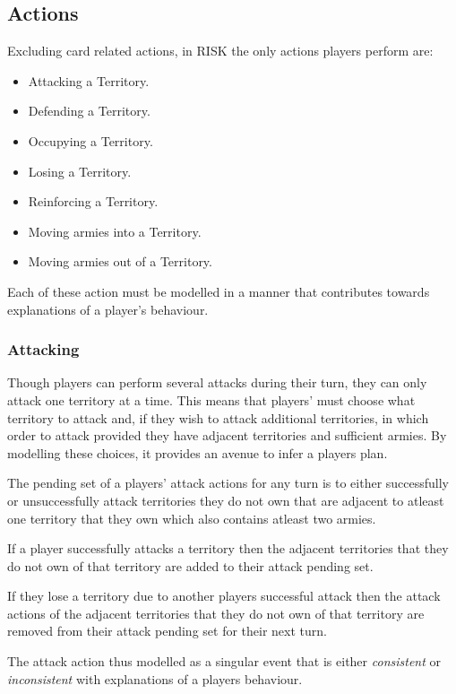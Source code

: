 \documentclass[parskip]{cs4rep}
\begin{document}
\subsection{Actions}

Excluding card related actions, in RISK the only actions players perform are:

\begin{itemize}
\item
Attacking a Territory.
\item
Defending a Territory.
\item
Occupying a Territory.
\item
Losing a Territory.
\item
Reinforcing a Territory.
\item
Moving armies into a Territory.
\item
Moving armies out of a Territory.
\end{itemize}

Each of these action must be modelled in a manner that contributes towards explanations of a player's behaviour.

\subsubsection{Attacking}

Though players can perform several attacks during their turn, they can only attack one territory at a time. This means that players' must choose what territory to attack and, if they wish to attack additional territories, in which order to attack provided they have adjacent territories and sufficient armies. By modelling these choices, it provides an avenue to infer a players plan.

The pending set of a players' attack actions for any turn is to either successfully or unsuccessfully attack territories they do not own that are adjacent to atleast one territory that they own which also contains atleast two armies.

If a player successfully attacks a territory then the adjacent territories that they do not own of that territory are added to their attack pending set.

If they lose a territory due to another players successful attack then the attack actions of the adjacent territories that they do not own of that territory are removed from their attack pending set for their next turn. 

The attack action thus modelled as a singular event that is either \textit{consistent} or \textit{inconsistent} with explanations of a players behaviour.
\end{document}
